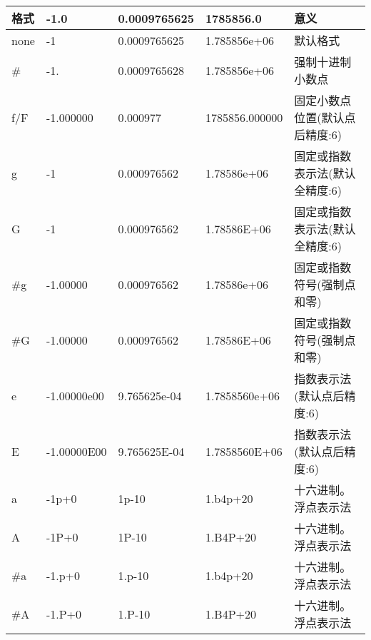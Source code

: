 \begin{longtable}[c]{|l|l|l|l|l|}
\hline
\textbf{格式} & \textbf{-1.0} & \textbf{0.0009765625} & \textbf{1785856.0} & \textbf{意义}                                         \\ \hline
\endfirsthead
%
\endhead
%
none           & -1            & 0.0009765625          & 1.785856e+06       & 默认格式                                           \\ \hline
\#             & -1.           & 0.0009765628          & 1.785856e+06       & 强制十进制小数点                                     \\ \hline
f/F            & -1.000000     & 0.000977              & 1785856.000000     & 固定小数点位置(默认点后精度:6)           \\ \hline
g              & -1            & 0.000976562           & 1.78586e+06        & 固定或指数表示法(默认全精度:6) \\ \hline
G              & -1            & 0.000976562           & 1.78586E+06        & 固定或指数表示法(默认全精度:6)  \\ \hline
\#g            & -1.00000      & 0.000976562           & 1.78586e+06        & 固定或指数符号(强制点和零)      \\ \hline
\#G            & -1.00000      & 0.000976562           & 1.78586E+06        & 固定或指数符号(强制点和零)      \\ \hline
e              & -1.00000e00   & 9.765625e-04          & 1.7858560e+06      & 指数表示法(默认点后精度:6)     \\ \hline
E              & -1.00000E00   & 9.765625E-04          & 1.7858560E+06      & 指数表示法(默认点后精度:6)     \\ \hline
a              & -1p+0         & 1p-10                 & 1.b4p+20           & 十六进制。浮点表示法                         \\ \hline
A              & -1P+0         & 1P-10                 & 1.B4P+20           & 十六进制。浮点表示法                         \\ \hline
\#a            & -1.p+0        & 1.p-10                & 1.b4p+20           & 十六进制。浮点表示法                         \\ \hline
\#A            & -1.P+0        & 1.P-10                & 1.B4P+20           & 十六进制。浮点表示法                         \\ \hline
\end{longtable}

